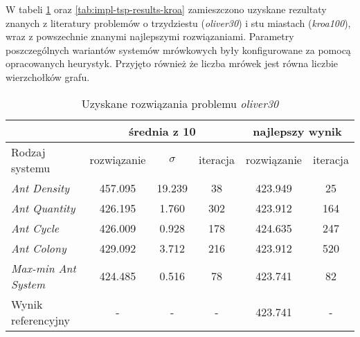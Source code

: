 {{{            W tabeli \ref{tab:impl-tsp-results-oliver} oraz \ref{tab:impl-tsp-results-kroa} zamieszczono uzyskane
            rezultaty znanych z literatury problemów o trzydziestu (\textit{oliver30}) i stu miastach
            (\textit{kroa100}), wraz z powszechnie znanymi najlepszymi rozwiązaniami. Parametry poszczególnych wariantów
            systemów mrówkowych były konfigurowane za pomocą opracowanych heurystyk. Przyjęto również że liczba mrówek
            jest równa liczbie wierzchołków grafu.
%
            \begin{table}[H]
                \centering
                \caption{Uzyskane rozwiązania problemu \textit{oliver30}}
                \begin{tabular}{ |l|c c c|c c| }
                    \hline
                    & \multicolumn{3}{c|}{średnia z 10} & \multicolumn{2}{c|}{najlepszy wynik} \\
                    \hline
                    Rodzaj systemu & rozwiązanie & $\sigma$ & iteracja & rozwiązanie & iteracja \\
                    \hline
                    \textit{Ant Density} & 457.095 & 19.239 & 38 & 423.949 & 25 \\
                    \textit{Ant Quantity} & 426.195 & 1.760 & 302 & 423.912 & 164 \\
                    \textit{Ant Cycle} & 426.009 & 0.928 & 178 & 424.635 & 247 \\
                    \textit{Ant Colony} & 429.092 & 3.712 & 216 & 423.912 & 520 \\
                    \textit{Max-min Ant System} & 424.485 & 0.516 & 78 & 423.741 & 82 \\
                    \hline
                    Wynik referencyjny & - & - & - & 423.741 & - \\
                    \hline
                \end{tabular}
                \label{tab:impl-tsp-results-oliver}
            \end{table}

}}}

